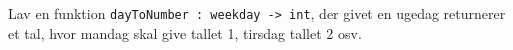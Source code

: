 Lav en funktion \lstinline{dayToNumber : weekday -> int}, der givet
  en ugedag returnerer et tal, hvor mandag skal give tallet 1, tirsdag
  tallet 2 osv.
